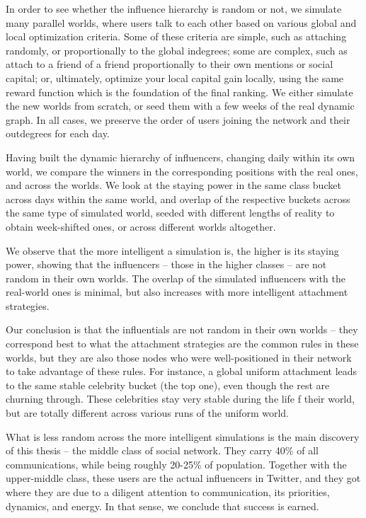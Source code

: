 \documentclass[10pt,oneside]{memoir}
\begin{document}
In order to see whether the influence hierarchy is random or not, we simulate many parallel worlds, where users talk to each other based on various global and local optimization criteria.  Some of these criteria are simple, such as attaching randomly, or proportionally to the global indegrees; some are complex, such as attach to a friend of a friend proportionally to their own mentions or social capital; or, ultimately, optimize your local capital gain locally, using the same reward function which is the foundation of the final ranking.  We either simulate the new worlds from scratch, or seed them with a few weeks of the real dynamic graph.  In all cases, we preserve the order of users joining the network and their outdegrees for each day.


Having built the dynamic hierarchy of influencers, changing daily within its own world, we compare the winners in the corresponding positions with the real ones, and across the worlds.  We look at the staying power in the same class bucket across days within the same world, and overlap of the respective buckets across the same type of simulated world, seeded with different lengths of reality to obtain week-shifted ones, or across different worlds altogether.


We observe that the more intelligent a simulation is, the higher is its staying power, showing that the influencers -- those in the higher classes -- are not random in their own worlds.  The overlap of the simulated influencers with the real-world ones is minimal, but also increases with more intelligent attachment strategies.


Our conclusion is that the influentials are not random in their own worlds -- they correspond best to what the attachment strategies are the common rules in these worlds, but they are also those nodes who were well-positioned in their network to take advantage of these rules.  For instance, a global uniform attachment leads to the same stable celebrity bucket (the top one), even though the rest are churning through.  These celebrities stay very stable during the life f their world, but are totally different across various runs of the uniform world.


What is less random across the more intelligent simulations is the main discovery of this thesis -- the middle class of social network.  They carry 40\% of all communications, while being roughly 20-25\% of population.  Together with the upper-middle class, these users are the actual influencers in Twitter, and they got where they are due to a diligent attention to communication, its priorities, dynamics, and energy.  In that sense, we conclude that success is earned.
\end{document}
